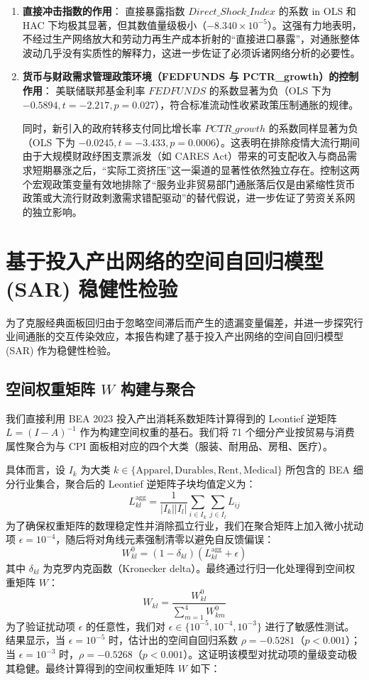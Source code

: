 \documentclass[UTF8,a4paper,11pt]{ctexart}
\begin{document}
\begin{enumerate}
    \item \textbf{直接冲击指数的作用}：
    直接暴露指数 $Direct\_Shock\_Index$ 的系数 in OLS 和 HAC 下均极其显著，但其数值量级极小（$-8.340 \times 10^{-5}$）。这强有力地表明，不经过生产网络放大和劳动力再生产成本折射的“直接进口暴露”，对通胀整体波动几乎没有实质性的解释力，这进一步佐证了必须诉诸网络分析的必要性。

    \item \textbf{货币与财政需求管理政策环境（FEDFUNDS 与 PCTR\_growth）的控制作用}：
    美联储联邦基金利率 $FEDFUNDS$ 的系数显著为负（OLS 下为 $-0.5894, t = -2.217, p = 0.027$），符合标准流动性收紧政策压制通胀的规律。

    同时，新引入的政府转移支付同比增长率 $PCTR\_growth$ 的系数同样显著为负（OLS 下为 $-0.0245, t = -3.433, p = 0.0006$）。这表明在排除疫情大流行期间由于大规模财政纾困支票派发（如 CARES Act）带来的可支配收入与商品需求短期暴涨之后，“实际工资挤压”这一渠道的显著性依然独立存在。控制这两个宏观政策变量有效地排除了“服务业非贸易部门通胀落后仅是由紧缩性货币政策或大流行财政刺激需求错配驱动”的替代假说，进一步佐证了劳资关系网的独立影响。
\end{enumerate}

\section{基于投入产出网络的空间自回归模型 (SAR) 稳健性检验}
为了克服经典面板回归由于忽略空间滞后而产生的遗漏变量偏差，并进一步探究行业间通胀的交互传染效应，本报告构建了基于投入产出网络的空间自回归模型 (SAR) 作为稳健性检验。

\subsection{空间权重矩阵 $W$ 构建与聚合}
我们直接利用 BEA 2023 投入产出消耗系数矩阵计算得到的 Leontief 逆矩阵 $L = (I - A)^{-1}$ 作为构建空间权重的基石。我们将 71 个细分产业按贸易与消费属性聚合为与 CPI 面板相对应的四个大类（服装、耐用品、房租、医疗）。

具体而言，设 $I_k$ 为大类 $k \in \{\text{Apparel}, \text{Durables}, \text{Rent}, \text{Medical}\}$ 所包含的 BEA 细分行业集合，聚合后的 Leontief 逆矩阵子块均值定义为：
\[L^{\text{agg}}_{kl} = \frac{1}{|I_k| |I_l|} \sum_{i \in I_k} \sum_{j \in I_l} L_{ij}\]
为了确保权重矩阵的数理稳定性并消除孤立行业，我们在聚合矩阵上加入微小扰动项 $\epsilon = 10^{-4}$，随后将对角线元素强制清零以避免自反馈偏误：
\[W^0_{kl} = (1 - \delta_{kl})(L^{\text{agg}}_{kl} + \epsilon)\]
其中 $\delta_{kl}$ 为克罗内克函数（Kronecker delta）。最终通过行归一化处理得到空间权重矩阵 $W$：
\[W_{kl} = \frac{W^0_{kl}}{\sum_{m=1}^{4} W^0_{km}}\]
为了验证扰动项 $\epsilon$ 的任意性，我们对 $\epsilon \in \{10^{-5}, 10^{-4}, 10^{-3}\}$ 进行了敏感性测试。结果显示，当 $\epsilon = 10^{-5}$ 时，估计出的空间自回归系数 $\rho = -0.5281$（$p < 0.001$）；当 $\epsilon = 10^{-3}$ 时，$\rho = -0.5268$（$p < 0.001$）。这证明该模型对扰动项的量级变动极其稳健。最终计算得到的空间权重矩阵 $W$ 如下：
\end{document}
